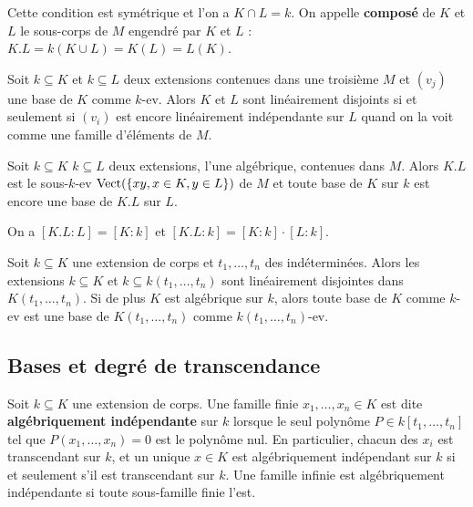 	\begin{rem}
		Cette condition est symétrique et l'on a $K \cap L = k$.
		On appelle \textbf{composé} de $K$ et $L$ le sous-corps de $M$ engendré par $K$ et $L$ : $K.L = k(K \cup L) = K(L) = L(K)$.
	\end{rem}
	
	\begin{pop}
		Soit $k \subseteq K$ et $k \subseteq L$ deux extensions contenues dans une troisième $M$ et $(v_j)$ une base de $K$ comme $k$-ev.
		Alors $K$ et $L$ sont linéairement disjoints si et seulement si $(v_i)$ est encore linéairement indépendante sur $L$ quand on la voit comme une famille d'éléments de $M$.
	\end{pop}
	
	\begin{pop}
		Soit $k \subseteq K$ $k \subseteq L$ deux extensions, l'une algébrique, contenues dans $M$.
		Alors $K.L$ est le sous-$k$-ev $\operatorname{Vect}(\{ xy, x \in K, y \in L \} )$ de $M$ et toute base de $K$ sur $k$ est encore une base de $K.L$ sur $L$.
	\end{pop}
	
	\begin{cor}
		On a $[K.L : L] = [K : k]$ et $[K.L : k] = [K : k] \cdot [L : k]$.
	\end{cor}
	
	\begin{pop}
		Soit $k \subseteq K$ une extension de corps et $t_1,\ldots,t_n$ des indéterminées.
		Alors les extensions $k \subseteq K$ et $k \subseteq k(t_1,\ldots,t_n)$ sont linéairement disjointes dans $K(t_1,\ldots,t_n)$.
		Si de plus $K$ est algébrique sur $k$, alors toute base de $K$ comme $k$-ev est une base de $K(t_1,\ldots,t_n)$ comme $k(t_1,\ldots,t_n)$-ev.
	\end{pop}


\subsection{Bases et degré de transcendance}

	\begin{defn}
		Soit $k \subseteq K$ une extension de corps.
		Une famille finie $x_1,\ldots,x_n \in K$ est dite \textbf{algébriquement indépendante} sur $k$ lorsque le seul polynôme $P \in k[t_1,\ldots,t_n]$ tel que $P(x_1,\ldots,x_n) = 0$ est le polynôme nul.
		En particulier, chacun des $x_i$ est transcendant sur $k$, et un unique $x \in K$ est algébriquement indépendant sur $k$ si et seulement s'il est transcendant sur $k$.
		Une famille infinie est algébriquement indépendante si toute sous-famille finie l'est.
	\end{defn}
	
